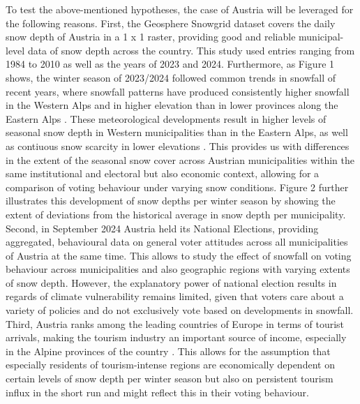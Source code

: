 \documentclass{article}
\begin{document}
To test the above-mentioned hypotheses, the case of Austria will be leveraged for the following reasons. First, the Geosphere Snowgrid dataset covers the daily snow depth of Austria in a 1 x 1 raster, providing good and reliable municipal-level data of snow depth across the country. This study used entries ranging from 1984 to 2010 as well as the years of 2023 and 2024. Furthermore, as Figure 1 shows, the winter season of 2023/2024 followed common trends in snowfall of recent years, where snowfall patterns have produced consistently higher snowfall in the Western Alps and in higher elevation than in lower provinces along the Eastern Alps \parencite{avalanchereport2024, Olefs2020, li2025}. These meteorological developments result in higher levels of seasonal snow depth in Western municipalities than in the Eastern Alps, as well as contiuous snow scarcity in lower elevations \parencite{li2025}. This provides us with differences in the extent of the seasonal snow cover across Austrian municipalities within the same institutional and electoral but also economic context, allowing for a comparison of voting behaviour under varying snow conditions. Figure 2 further illustrates this development of snow depths per winter season by showing the extent of deviations from the historical average in snow depth per municipality. 
Second, in September 2024 Austria held its National Elections, providing aggregated, behavioural data on general voter attitudes across all municipalities of Austria at the same time. This allows to study the effect of snowfall on voting behaviour across municipalities and also geographic regions with varying extents of snow depth. However, the explanatory power of national election results in regards of climate vulnerability remains limited, given that voters care about a variety of policies and do not exclusively vote based on developments in snowfall. 
Third, Austria ranks among the leading countries of Europe in terms of tourist arrivals, making the tourism industry an important source of income, especially in the Alpine provinces of the country \parencite{fritz2025}. This allows for the assumption that especially residents of tourism-intense regions are economically dependent on certain levels of snow depth per winter season but also on persistent tourism influx in the short run and might reflect this in their voting behaviour. 
\end{document}
